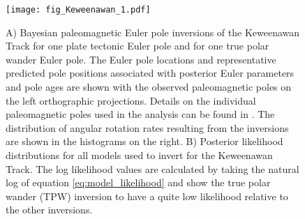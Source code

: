 \documentclass[]{agujournal2019}
\begin{document}
\begin{figure}
\centering
\texttt{[image: fig\_Keweenawan\_1.pdf]}
\caption{A) Bayesian paleomagnetic Euler pole inversions of the Keweenawan Track for one plate tectonic Euler pole and for one true polar wander Euler pole. The Euler pole locations and representative predicted pole positions associated with posterior Euler parameters and pole ages are shown with the observed paleomagnetic poles on the left orthographic projections. Details on the individual paleomagnetic poles used in the analysis can be found in . The distribution of angular rotation rates resulting from the inversions are shown in the histograms on the right. B) Posterior likelihood distributions for all models used to invert for the Keweenawan Track. The log likelihood values are calculated by taking the natural log of equation \ref{eq:model_likelihood} and show the true polar wander (TPW) inversion to have a quite low likelihood relative to the other inversions.}
\label{fig:Keweenawan_Track_1}
\end{figure}
\end{document}
